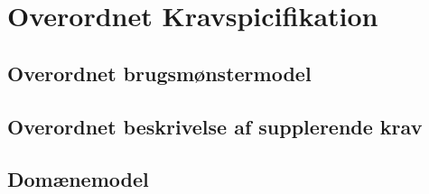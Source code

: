 \section{Overordnet Kravspicifikation}

\subsection{Overordnet brugsmønstermodel}

\subsection{Overordnet beskrivelse af supplerende krav}

\subsection{Domænemodel}
